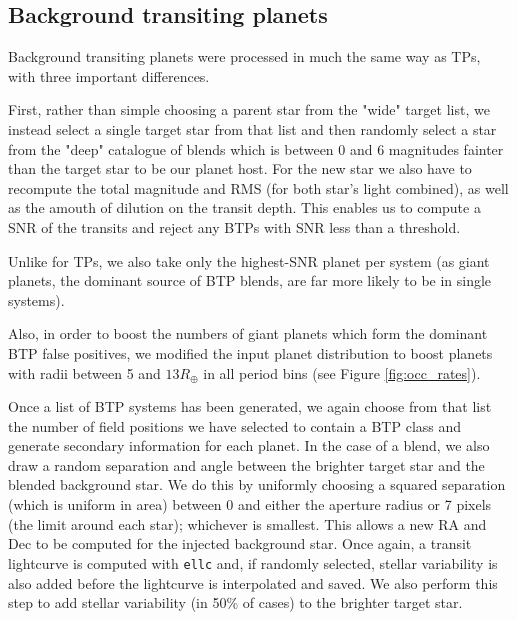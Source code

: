 \documentclass{article}
\begin{document}
\subsection{Background transiting planets}
Background transiting planets were processed in much the same way as TPs, with three important differences.

First, rather than simple choosing a parent star from the "wide" target list, we instead select a single target star from that list and then randomly select a star from the "deep" catalogue of blends which is between 0 and 6 magnitudes fainter than the target star to be our planet host. For the new star we also have to recompute the total magnitude and RMS (for both star's light combined), as well as the amouth of dilution on the transit depth. This enables us to compute a SNR of the transits and reject any BTPs with SNR less than a threshold.

Unlike for TPs, we also take only the highest-SNR planet per system (as giant planets, the dominant source of BTP blends, are far more likely to be in single systems). 

Also, in order to boost the numbers of giant planets which form the dominant BTP false positives, we modified the input planet distribution to boost planets with radii between 5 and $13R_\oplus$ in all period bins (see Figure \ref{fig:occ_rates}).

Once a list of BTP systems has been generated, we again choose from that list the number of field positions we have selected to contain a BTP class and generate secondary information for each planet.
In the case of a blend, we also draw a random separation and angle between the brighter target star and the blended background star.
We do this by uniformly choosing a squared separation (which is uniform in area) between 0 and either the aperture radius \citep[derived with info from][]{marchiori2019flight} or 7 pixels (the limit around each star); whichever is smallest.
This allows a new RA and Dec to be computed for the injected background star.
Once again, a transit lightcurve is computed with \texttt{ellc} and, if randomly selected, stellar variability is also added before the lightcurve is interpolated and saved.
We also perform this step to add stellar variability (in 50\% of cases) to the brighter target star.
\end{document}
